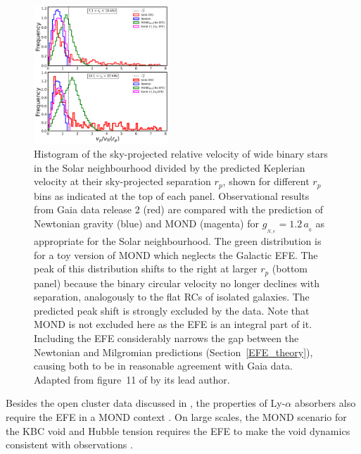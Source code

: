 \documentclass[fleqn,usenatbib,useAMS,onecolumn]{mnras} %
\begin{document}
\begin{figure}
	\centering
	\includegraphics[width=0.45\textwidth]{Pittordis_2019_Figure_11}
	\caption{Histogram of the sky-projected relative velocity of wide binary stars in the Solar neighbourhood divided by the predicted Keplerian velocity at their sky-projected separation $r_p$, shown for different $r_p$ bins as indicated at the top of each panel. Observational results from Gaia data release 2 (red) are compared with the prediction of Newtonian gravity (blue) and MOND (magenta) for $g_{_{N,e}} = 1.2 \, a_{_0}$ as appropriate for the Solar neighbourhood. The green distribution is for a toy version of MOND which neglects the Galactic EFE. The peak of this distribution shifts to the right at larger $r_p$ (bottom panel) because the binary circular velocity no longer declines with separation, analogously to the flat RCs of isolated galaxies. The predicted peak shift is strongly excluded by the data. Note that MOND is not excluded here as the EFE is an integral part of it. Including the EFE considerably narrows the gap between the Newtonian and Milgromian predictions (Section~\ref{EFE_theory}), causing both to be in reasonable agreement with Gaia data. Adapted from figure~11 of \citet{Pittordis_2019} by its lead author.}
	\label{Pittordis_2019_Figure_11}
\end{figure}

Besides the open cluster data discussed in \citet{Milgrom_1983}, the properties of Ly-$\alpha$ absorbers also require the EFE in a MOND context \citep[Section~\ref{Large_scale_structure}; see also][]{Aguirre_2001}. On large scales, the MOND scenario for the KBC void and Hubble tension requires the EFE to make the void dynamics consistent with observations \citep[Section~\ref{nuHDM_late}; see also the inference on the EFE in figure~4 of][]{Haslbauer_2020}.
\end{document}
